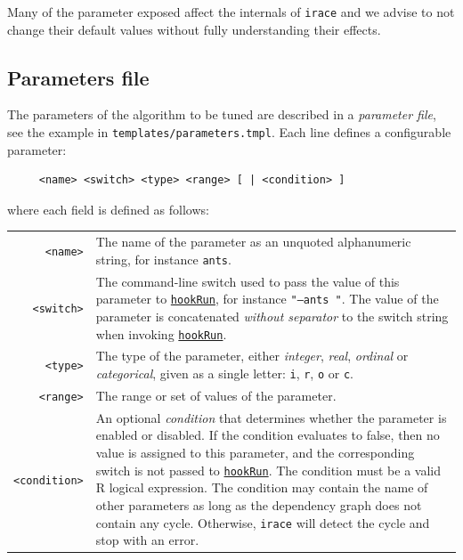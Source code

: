 \documentclass[a4paper]{article}
\newcommand{\irace}{\texttt{irace}\xspace}
\newcommand{\aR}{\textsf{R}\xspace}
\newcommand{\parameter}[1]{\hyperlink{opt:#1}{\texttt{#1}}}
\begin{document}
Many of the parameter exposed affect the internals of \irace and we
advise to not change their default values without fully understanding
their effects.




\subsection{Parameters file}\label{sec:paramFile}

The parameters of the algorithm to be tuned are described in a
\emph{parameter file}, see the example in \verb|templates/parameters.tmpl|. Each line defines a configurable parameter:
%
\begin{verbatim}
     <name> <switch> <type> <range> [ | <condition> ]
\end{verbatim}
%
where each field is defined as follows:
%
\begin{center}
\renewcommand{\arraystretch}{1.2}
  \begin{tabularx}{0.98\linewidth}{@{}rX}
    \texttt{<name>} & The name of the parameter as an unquoted
    alphanumeric string,
    for instance \texttt{ants}.\\
    \texttt{<switch>}& The command-line switch used to pass the value of this parameter to \parameter{hookRun}, for instance \texttt{"--ants "}. The value of the parameter is concatenated \emph{without separator} to the switch string when invoking \parameter{hookRun}.\\

    \texttt{{<type>}} &The type of the parameter, either
    \textit{integer},
    \textit{real}, \textit{ordinal} or \textit{categorical}, given as a single letter: \texttt{i}, \texttt{r}, \texttt{o} or \texttt{c}. \\
    \texttt{{<range>}} &The range or set of values of the parameter.\\
    \texttt{{<condition>}}& An optional \emph{condition} that
    determines whether the parameter is enabled or disabled. If the
    condition evaluates to false, then no value is assigned to this
    parameter, and the corresponding switch is not passed
    to \parameter{hookRun}. The condition must be a valid \aR logical
    expression. The condition may contain the name of other parameters
    as long as the dependency graph does not contain any
    cycle. Otherwise, \irace will detect the cycle and stop with an error.\\
  \end{tabularx}
\end{center}
\end{document}
